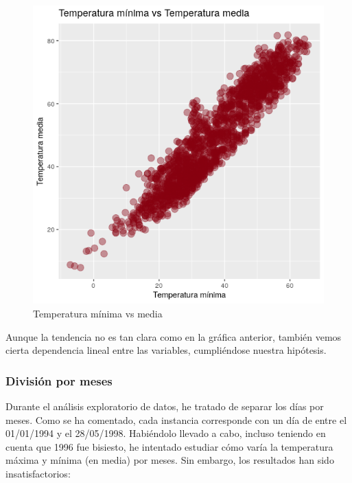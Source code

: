 \begin{itemize}
	 \begin{figure}[H] %
	 	\centering
	 	\includegraphics[scale=0.5]{hip2.png}  %
	 	\caption{Temperatura mínima vs media} 
	 	\label{fig:hip2}
	 \end{figure}
 
Aunque la tendencia no es tan clara como en la gráfica anterior, también vemos cierta dependencia lineal entre las variables, cumpliéndose nuestra hipótesis.
	
\end{itemize}


\subsubsection{División por meses}

Durante el análisis exploratorio de datos, he tratado de separar los días por meses. Como se ha comentado, cada instancia corresponde con un día de entre el 01/01/1994 y el 28/05/1998. Habiéndolo llevado a cabo, incluso teniendo en cuenta que 1996 fue bisiesto, he intentado estudiar cómo varía la temperatura máxima y mínima (en media) por meses. Sin embargo, los resultados han sido insatisfactorios:

